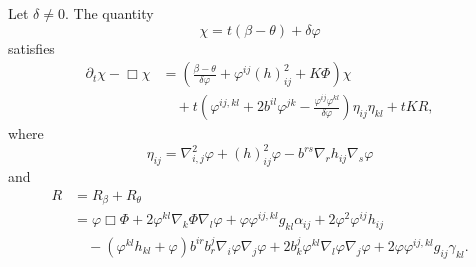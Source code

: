 \documentclass{amsart}
\begin{document}
\begin{theorem}
\label{thm:Evchi}
Let $\delta \neq 0.$ The quantity 
\[
\chi = t(\beta - \theta) + \delta\varphi
\]
satisfies
\[
\begin{split}
\partial_t \chi -\Box\chi &= \left(\frac{\beta - \theta}{\delta\varphi} + \varphi^{ij}(h)^2_{ij} + K\Phi\right)\chi \\
& \quad + t\left(\varphi^{ij,kl} + 2b^{il}\varphi^{jk} - \frac{\varphi^{ij}\varphi^{kl}}{\delta\varphi}\right)\eta_{ij}\eta_{kl} + tK R,
\end{split}
\]
where
\[
\eta_{ij} = \nabla^2_{i,j}\varphi + (h)^2_{ij}\varphi - b^{rs}\nabla_r h_{ij}\nabla_s \varphi
\]
and
\[
\begin{split}
R &= R_{\beta} + R_{\theta} \\
&= \varphi \Box \Phi + 2\varphi^{kl} \nabla_k \Phi \nabla_l \varphi + \varphi \varphi^{ij,kl}g_{kl} \alpha_{ij} + 2\varphi^{2}\varphi^{ij}h_{ij} \\
&\quad -(\varphi^{kl}h_{kl} + \varphi)b^{ir}b^{j}_{r}\nabla_i \varphi\nabla_j\varphi + 2 b^{j}_{k}\varphi^{kl}\nabla_l\varphi\nabla_j\varphi + 2 \varphi\varphi^{ij,kl} g_{ij} \gamma_{kl}.
\end{split}
\]
\end{theorem}
	
\end{document}
